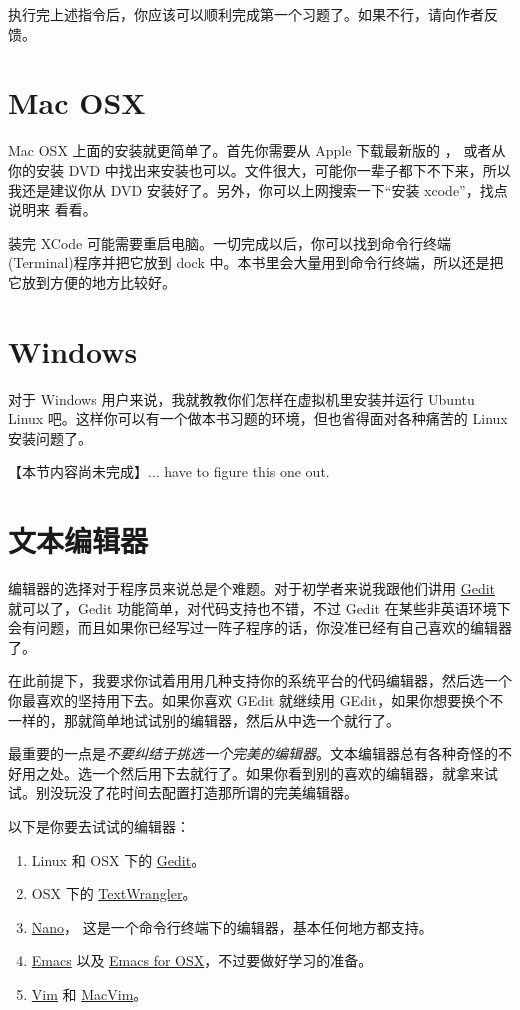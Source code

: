 执行完上述指令后，你应该可以顺利完成第一个习题了。如果不行，请向作者反馈。


\section{Mac OSX}

Mac OSX 上面的安装就更简单了。首先你需要从 Apple 下载最新版的 ，
或者从你的安装 DVD 中找出来安装也可以。文件很大，可能你一辈子都下不下来，所以
我还是建议你从 DVD 安装好了。另外，你可以上网搜索一下“安装 xcode”，找点说明来
看看。

装完 XCode 可能需要重启电脑。一切完成以后，你可以找到命令行终端(Terminal)程序并把它放到 dock 中。本书里会大量用到命令行终端，所以还是把它放到方便的地方比较好。

\section{Windows}

对于 Windows 用户来说，我就教教你们怎样在虚拟机里安装并运行 Ubuntu Linux 吧。这样你可以有一个做本书习题的环境，但也省得面对各种痛苦的 Linux 安装问题了。

【本节内容尚未完成】... have to figure this one out.


\section{文本编辑器}

编辑器的选择对于程序员来说总是个难题。对于初学者来说我跟他们讲用 \href{http://projects.gnome.org/gedit/}{Gedit} 就可以了，Gedit 功能简单，对代码支持也不错，不过 Gedit 在某些非英语环境下会有问题，而且如果你已经写过一阵子程序的话，你没准已经有自己喜欢的编辑器了。

在此前提下，我要求你试着用用几种支持你的系统平台的代码编辑器，然后选一个你最喜欢的坚持用下去。如果你喜欢 GEdit 就继续用 GEdit，如果你想要换个不一样的，那就简单地试试别的编辑器，然后从中选一个就行了。

最重要的一点是\emph{不要纠结于挑选一个完美的编辑器}。文本编辑器总有各种奇怪的不好用之处。选一个然后用下去就行了。如果你看到别的喜欢的编辑器，就拿来试试。别没玩没了花时间去配置打造那所谓的完美编辑器。

以下是你要去试试的编辑器：

\begin{enumerate}
\item Linux 和 OSX 下的  \href{http://projects.gnome.org/gedit/}{Gedit}。
\item OSX 下的  \href{http://www.barebones.com/products/textwrangler/}{TextWrangler}。
\item \href{http://www.nano-editor.org/}{Nano}， 这是一个命令行终端下的编辑器，基本任何地方都支持。
\item \href{http://www.gnu.org/software/emacs/}{Emacs} 以及 \href{http://emacsformacosx.com/}{Emacs for OSX}，不过要做好学习的准备。
\item \href{http://www.vim.org/}{Vim} 和  \href{http://code.google.com/p/macvim/}{MacVim}。
\end{enumerate}

